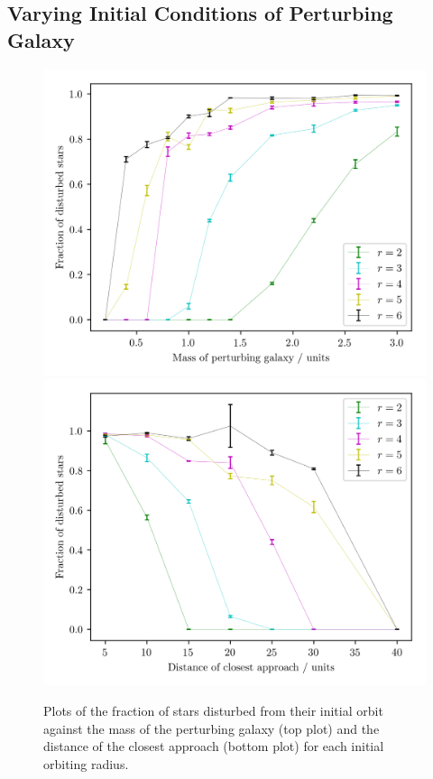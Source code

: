 \documentclass[twoside,twocolumn]{article}
\begin{document}
    \subsection{Varying Initial Conditions of Perturbing Galaxy}

        \begin{figure}
            \centering
            \includegraphics[width=\linewidth]{images/varying_mass.png}
            \includegraphics[width=\linewidth]{images/varying_rmin.png}
            \caption{Plots of the fraction of stars disturbed from their initial orbit against the mass of the perturbing galaxy (top plot) and the distance of the closest approach (bottom plot) for each initial orbiting radius.}
            \label{figure:varying}
        \end{figure}
\end{document}
